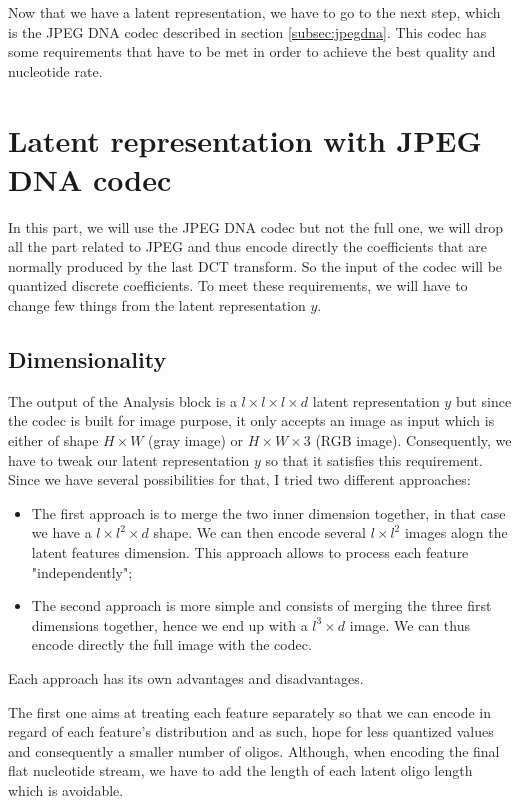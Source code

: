 Now that we have a latent representation, we have to go to the next step, which is the JPEG DNA codec described in section \ref{subsec:jpegdna}. This codec has some requirements that have to be met in order to achieve the best quality and nucleotide rate.

\section{Latent representation with JPEG DNA codec}

In this part, we will use the JPEG DNA codec but not the full one, we will drop all the part related to JPEG and thus encode directly the coefficients that are normally produced by the last DCT transform. So the input of the codec will be quantized discrete coefficients. To meet these requirements, we will have to change few things from the latent representation $y$.

\subsection{Dimensionality}

The output of the Analysis block is a $l \times l \times l \times d$ latent representation $y$ but since the codec is built for image purpose, it only accepts an image as input which is either of shape $H \times W$ (gray image) or $H \times W \times 3$ (RGB image). 
Consequently, we have to tweak our latent representation $y$ so that it satisfies this requirement. Since we have several possibilities for that, I tried two different approaches:

\begin{itemize}
    \item The first approach is to merge the two inner dimension together, in that case we have a $l \times l^2 \times d$ shape. We can then encode several $l \times l^2$ images alogn the latent features dimension. This approach allows to process each feature "independently";
    \item The second approach is more simple and consists of merging the three first dimensions together, hence we end up with a $l^3 \times d$ image. We can thus encode directly the full image with the codec.
\end{itemize}

Each approach has its own advantages and disadvantages. 

The first one aims at treating each feature separately so that we can encode in regard of each feature's distribution and as such, hope for less quantized values and consequently a smaller number of oligos. Although, when encoding the final flat nucleotide stream, we have to add the length of each latent oligo length which is avoidable.

